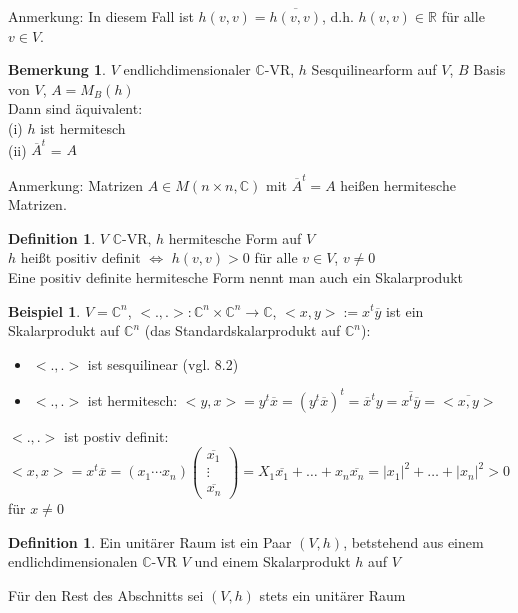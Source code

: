 \documentclass[10pt,a4paper,numbers=endperiod]{scrartcl}
\theoremstyle{definition}
\newtheorem{defi}[satz]{Definition}
\newtheorem{bem}[satz]{Bemerkung}
\newtheorem{bsp}[satz]{Beispiel}
\def\CC{{\mathbb C}}
\def\RR{{\mathbb R}}
\begin{document}
Anmerkung: In diesem Fall ist $h(v,v) = \overline{h(v,v)}$, d.h. $h(v,v) \in \RR$ für alle $v \in V$.

\begin{bem}
	$V$ endlichdimensionaler $\CC$-VR, $h$ Sesquilinearform auf $V$, $B$ Basis von $V$, $A = M_B(h)$\\
	Dann sind äquivalent:\\
	(i) $h$ ist hermitesch\\
	(ii) $\overline{A}^t$ = $A$
\end{bem}

Anmerkung: Matrizen $A \in M(n \times n, \CC)$ mit $\overline{A}^t = A$ heißen hermitesche Matrizen.

\begin{defi}
	$V$ $\CC$-VR, $h$ hermitesche Form auf $V$\\
	$h$ heißt positiv definit $\Leftrightarrow$ $h(v,v) > 0$ für alle $v \in V$, $v \neq 0$\\
	Eine positiv definite hermitesche Form nennt man auch ein Skalarprodukt
\end{defi}

\begin{bsp}
	$V = \CC^n$, $<.,.>: \CC^n \times \CC^n \rightarrow \CC$, $<x,y> := x^t\overline{y}$ ist ein Skalarprodukt auf $\CC^n$ (das Standardskalarprodukt auf $\CC^n$):\\
	\begin{itemize}
		\item $<.,.>$ ist sesquilinear (vgl. 8.2)
		\item $<.,.>$ ist hermitesch: $<y,x> = y^t \overline{x} = (y^t\overline{x})^t = \overline{x}^t y = \overline{x^t \overline{y}} = \overline{<x,y>}$
	\end{itemize}
	$<.,.>$ ist postiv definit: $<x,x> = x^t\overline{x} = (x_1 \cdots x_n) \begin{pmatrix}
	\overline{x_1}\\
	\vdots\\
	\overline{x_n}
	\end{pmatrix} = X_1\overline{x_1} + \ldots +x_n \overline{x_n} = |x_1|^2+ \ldots + |x_n|^2 > 0$ für $x \neq 0$ 
\end{bsp}

\begin{defi}
	Ein unitärer Raum ist ein Paar $(V,h)$, betstehend aus einem endlichdimensionalen $\CC$-VR $V$ und einem Skalarprodukt $h$ auf $V$
\end{defi}

Für den Rest des Abschnitts sei $(V,h)$ stets ein unitärer Raum\\
\end{document}

